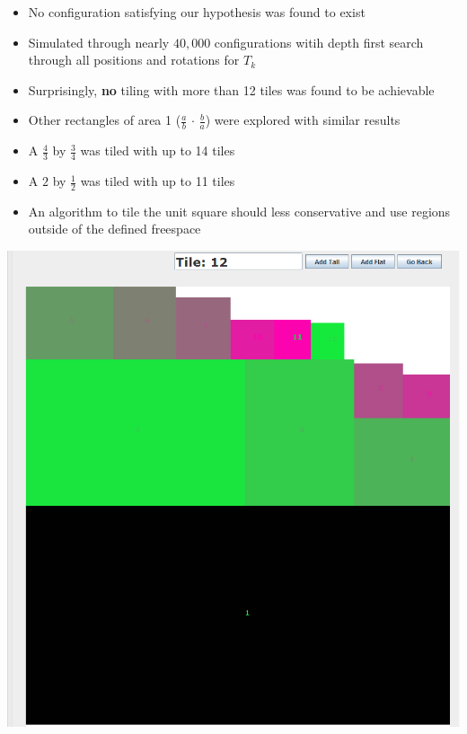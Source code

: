 \documentclass[landscape,a0paper,fontscale=0.255]{baposter} %
\newcommand{\compresslist}{ %
\setlength{\itemsep}{1pt}
\setlength{\parskip}{0pt}
\setlength{\parsep}{0pt}
}
\begin{document}
\begin{poster}
{\begin{multicols}{2}
\begin{itemize}\compresslist
\item No configuration satisfying our hypothesis was found to exist
\item Simulated through nearly $40,000$ configurations witih depth first search through all positions and rotations for $T_k$ 
\item Surprisingly, \textbf{no} tiling with more than 12 tiles was found to be achievable
\item Other rectangles of area 1 ($\frac{a}{b}$ $\cdot$ $\frac {b}{a}$) were explored with similar results
\item A $\frac{4}{3}$ by $\frac {3}{4}$ was tiled with up to 14 tiles
\item A $2$ by $\frac {1}{2}$ was tiled with up to 11 tiles
\item An algorithm to tile the unit square should less conservative and use regions outside of the defined freespace
\end{itemize}
\begin{center}
\includegraphics[width=0.8\linewidth]{Config_12A}
\end{center}

\end{multicols}
}



\end{poster}
\end{document}
